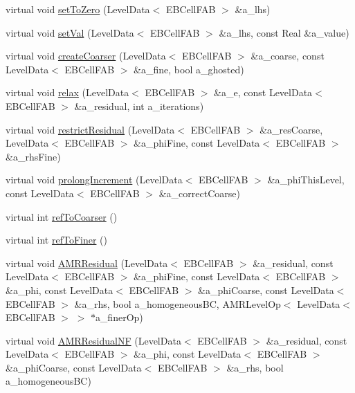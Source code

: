 \begin{DoxyCompactItemize}
virtual void \hyperlink{classnwoebconductivityop_a35ff6ab7c712304c004c0b0478ed2731}{set\+To\+Zero} (Level\+Data$<$ E\+B\+Cell\+F\+AB $>$ \&a\+\_\+lhs)
\item 
virtual void \hyperlink{classnwoebconductivityop_ae56c5b2c0e2294024b8cffe38231cf8a}{set\+Val} (Level\+Data$<$ E\+B\+Cell\+F\+AB $>$ \&a\+\_\+lhs, const Real \&a\+\_\+value)
\item 
virtual void \hyperlink{classnwoebconductivityop_a30b12742a5c49934293bbadf77b79816}{create\+Coarser} (Level\+Data$<$ E\+B\+Cell\+F\+AB $>$ \&a\+\_\+coarse, const Level\+Data$<$ E\+B\+Cell\+F\+AB $>$ \&a\+\_\+fine, bool a\+\_\+ghosted)
\item 
virtual void \hyperlink{classnwoebconductivityop_ac2417aa2264d5540eea099d4896d1508}{relax} (Level\+Data$<$ E\+B\+Cell\+F\+AB $>$ \&a\+\_\+e, const Level\+Data$<$ E\+B\+Cell\+F\+AB $>$ \&a\+\_\+residual, int a\+\_\+iterations)
\item 
virtual void \hyperlink{classnwoebconductivityop_a0e9cc6a30c1237c4437c7ecf407f390d}{restrict\+Residual} (Level\+Data$<$ E\+B\+Cell\+F\+AB $>$ \&a\+\_\+res\+Coarse, Level\+Data$<$ E\+B\+Cell\+F\+AB $>$ \&a\+\_\+phi\+Fine, const Level\+Data$<$ E\+B\+Cell\+F\+AB $>$ \&a\+\_\+rhs\+Fine)
\item 
virtual void \hyperlink{classnwoebconductivityop_a2281c76ee78290b558e440b0a14411d6}{prolong\+Increment} (Level\+Data$<$ E\+B\+Cell\+F\+AB $>$ \&a\+\_\+phi\+This\+Level, const Level\+Data$<$ E\+B\+Cell\+F\+AB $>$ \&a\+\_\+correct\+Coarse)
\item 
virtual int \hyperlink{classnwoebconductivityop_a054f1d15b14a5c83782053d67cd3a520}{ref\+To\+Coarser} ()
\item 
virtual int \hyperlink{classnwoebconductivityop_a3867d337536361ca2c9e528025018da6}{ref\+To\+Finer} ()
\item 
virtual void \hyperlink{classnwoebconductivityop_a98b33591eac76df798aa4f8b6c15c8d0}{A\+M\+R\+Residual} (Level\+Data$<$ E\+B\+Cell\+F\+AB $>$ \&a\+\_\+residual, const Level\+Data$<$ E\+B\+Cell\+F\+AB $>$ \&a\+\_\+phi\+Fine, const Level\+Data$<$ E\+B\+Cell\+F\+AB $>$ \&a\+\_\+phi, const Level\+Data$<$ E\+B\+Cell\+F\+AB $>$ \&a\+\_\+phi\+Coarse, const Level\+Data$<$ E\+B\+Cell\+F\+AB $>$ \&a\+\_\+rhs, bool a\+\_\+homogeneous\+BC, A\+M\+R\+Level\+Op$<$ Level\+Data$<$ E\+B\+Cell\+F\+AB $>$ $>$ $\ast$a\+\_\+finer\+Op)
\item 
virtual void \hyperlink{classnwoebconductivityop_a04d4ada221b5f5446fd06b1c40e470c2}{A\+M\+R\+Residual\+NF} (Level\+Data$<$ E\+B\+Cell\+F\+AB $>$ \&a\+\_\+residual, const Level\+Data$<$ E\+B\+Cell\+F\+AB $>$ \&a\+\_\+phi, const Level\+Data$<$ E\+B\+Cell\+F\+AB $>$ \&a\+\_\+phi\+Coarse, const Level\+Data$<$ E\+B\+Cell\+F\+AB $>$ \&a\+\_\+rhs, bool a\+\_\+homogeneous\+BC)

\end{DoxyCompactItemize}
